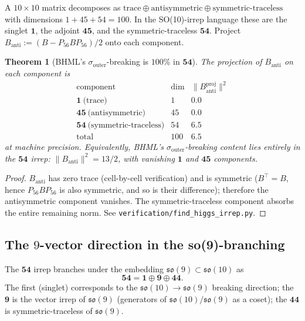 \documentclass[11pt,reqno]{amsart}
\newtheorem{theorem}{Theorem}[section]
\theoremstyle{definition}
\newcommand{\so}{\mathfrak{so}}
\newcommand{\Psix}{P_{56}}
\newcommand{\sout}{\sigma_{\mathrm{outer}}}
\begin{document}
A $10 \times 10$ matrix decomposes as
$\mathrm{trace} \oplus \mathrm{antisymmetric} \oplus
\mathrm{symmetric\text{-}traceless}$ with dimensions
$1 + 45 + 54 = 100$. In the SO(10)-irrep language these are the
singlet $\mathbf{1}$, the adjoint $\mathbf{45}$, and the
symmetric-traceless $\mathbf{54}$. Project $B_{\mathrm{anti}} := (B - \Psix
B \Psix)/2$ onto each component.

\begin{theorem}[BHML's $\sout$-breaking is $100\%$ in $\mathbf{54}$]
\label{thm:54-irrep}
The projection of $B_{\mathrm{anti}}$ on each component is
\[
  \begin{array}{c|c|c}
    \text{component} & \text{dim} & \|B_{\mathrm{anti}}^{\text{proj}}\|^2 \\\hline
    \mathbf{1}\ \text{(trace)}     & 1  & 0.0 \\
    \mathbf{45}\ \text{(antisymmetric)} & 45 & 0.0 \\
    \mathbf{54}\ \text{(symmetric-traceless)} & 54 & 6.5 \\\hline
    \text{total} & 100 & 6.5
  \end{array}
\]
at machine precision. Equivalently, BHML's $\sout$-breaking content
lies entirely in the $\mathbf{54}$ irrep: $\|B_{\mathrm{anti}}\|^2
= 13/2$, with vanishing $\mathbf{1}$ and $\mathbf{45}$ components.
\end{theorem}

\begin{proof}
$B_{\mathrm{anti}}$ has zero trace (cell-by-cell verification) and is
symmetric ($B^\top = B$, hence $\Psix B \Psix$ is also symmetric,
and so is their difference); therefore the antisymmetric component
vanishes. The symmetric-traceless component absorbs the entire
remaining norm. See \texttt{verification/find\_higgs\_irrep.py}.
\end{proof}

\subsection{The $9$-vector direction in the so(9)-branching}

The $\mathbf{54}$ irrep branches under the embedding $\so(9)
\subset \so(10)$ as
\[
  \mathbf{54} = \mathbf{1} \oplus \mathbf{9} \oplus \mathbf{44}.
\]
The first (singlet) corresponds to the $\so(10) \to \so(9)$ breaking
direction; the $\mathbf{9}$ is the vector irrep of $\so(9)$
(generators of $\so(10)/\so(9)$ as a coset); the $\mathbf{44}$ is
symmetric-traceless of $\so(9)$.
\end{document}
